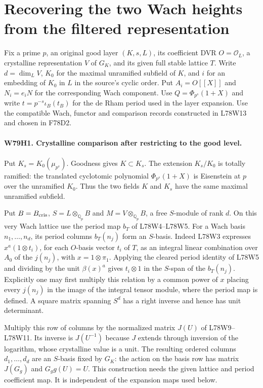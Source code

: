\section{Recovering the two Wach heights from the filtered representation}

Fix a prime $p$, an original good layer $(K,s,L)$, its coefficient
DVR $O=\mathcal O_L$, a crystalline representation $V$ of $G_K$,
and its given full stable lattice $T$. Write $d=\dim_L V$,
$K_0$ for the maximal unramified subfield of $K$, and $i$ for an
embedding of $K_0$ in $L$ in the source's cyclic order. Put
$A_i=O[[X]]$ and $N_i=e_i N$ for the corresponding Wach component.
Use $Q=\Phi_{p^s}(1+X)$ and write $t=p^{-s}\iota_B(t_B)$ for the de Rham period used in the layer expansion.
Use the compatible Wach, functor and comparison records constructed
in L78W13 and chosen in F78D2.

\paragraph{W79H1. Crystalline comparison after restricting to the good level.}
Put $K_s=K_0(\mu_{p^s})$. Goodness gives $K\subset K_s$.
The extension $K_s/K_0$ is totally ramified: the translated
cyclotomic polynomial $\Phi_{p^s}(1+X)$ is Eisenstein at $p$
over the unramified $K_0$. Thus the two fields $K$ and $K_s$
have the same maximal unramified subfield.

Put $B=B_{\rm cris}$, $S=L\otimes_{\mathbb Q_p}B$ and
$M=V\otimes_{\mathbb Q_p}B$, a free $S$-module of rank $d$.
On this very Wach lattice use the period map $b_T$ of L78W4--L78W5.
For a Wach basis $n_1,\ldots,n_d$, its period columns
$b_T(n_j)$ form an $S$-basis. Indeed L78W3 expresses
$x^a(1\otimes t_i)$, for each $O$-basis vector $t_i$ of $T$, as
an integral linear combination over $A_0$ of the $j(n_j)$,
with $x=1\otimes\pi_1$. Applying the cleared period identity
of L78W5 and dividing by the unit $\beta(x)^a$ gives $t_i\otimes1$
in the $S$-span of the $b_T(n_j)$. Explicitly one may first
multiply this relation by a common power of $x$ placing every
$j(n_j)$ in the image of the integral tensor module, where the
period map is defined. A square matrix spanning $S^d$ has a
right inverse and hence has unit determinant.

Multiply this row of columns by the normalized matrix $J(U)$ of
L78W9--L78W11. Its inverse is $J(U^{-1})$ because $J$ extends
through inversion of the logarithm, whose crystalline value is a
unit. The resulting ordered columns $d_1,\ldots,d_d$ are an
$S$-basis fixed by $G_K$: the action on the basis row has matrix
$J(G_g)$ and $G_g g(U)=U$. This construction needs the given
lattice and period coefficient map. It is independent of the
expansion maps used below.

